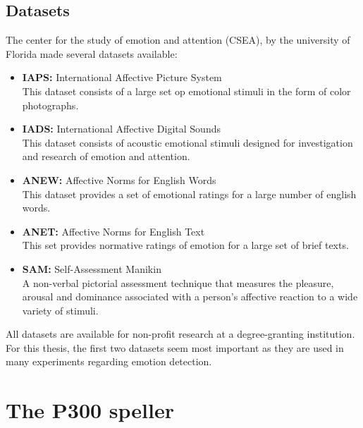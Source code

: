 \subsection{Datasets}
The center for the study of emotion and attention (CSEA), by the university of Florida made several datasets available:
\begin{itemize}
\item \textbf{IAPS:} International Affective Picture System\\
This dataset consists of a large set op emotional stimuli in the form of color photographs.
\item \textbf{IADS:} International Affective Digital Sounds \\
This dataset consists of acoustic emotional stimuli designed for investigation and research of emotion and attention.
\item \textbf{ANEW:} Affective Norms for English Words\\
This dataset provides a set of emotional ratings for a large number of english words.
\item \textbf{ANET:} Affective Norms for English Text\\
This set provides normative ratings of emotion for a large set of brief texts.
\item \textbf{SAM:} Self-Assessment Manikin\\
A non-verbal pictorial assessment technique that measures the pleasure, arousal and dominance associated with a person's affective reaction to a wide variety of stimuli.
\end{itemize}
All datasets are available for non-profit research at a degree-granting institution\cite{DataSets}. For this thesis, the first two datasets seem most important as they are used in many experiments regarding emotion detection\cite{ExtendedPaper}\cite{EmotionSite}\cite{RealTimeEEGEmotion}\cite{EEGDatasets}.

\section{The P300 speller}

